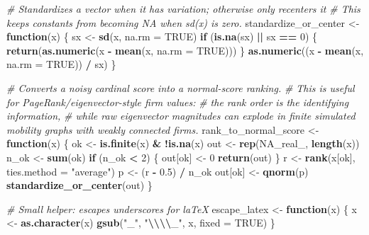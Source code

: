 \documentclass[
]{article}
\newenvironment{Shaded}{\begin{snugshade}}{\end{snugshade}}
\newcommand{\AttributeTok}[1]{\textcolor[rgb]{0.13,0.29,0.53}{#1}}
\newcommand{\CommentTok}[1]{\textcolor[rgb]{0.56,0.35,0.01}{\textit{#1}}}
\newcommand{\ConstantTok}[1]{\textcolor[rgb]{0.56,0.35,0.01}{#1}}
\newcommand{\ControlFlowTok}[1]{\textcolor[rgb]{0.13,0.29,0.53}{\textbf{#1}}}
\newcommand{\DecValTok}[1]{\textcolor[rgb]{0.00,0.00,0.81}{#1}}
\newcommand{\FloatTok}[1]{\textcolor[rgb]{0.00,0.00,0.81}{#1}}
\newcommand{\FunctionTok}[1]{\textcolor[rgb]{0.13,0.29,0.53}{\textbf{#1}}}
\newcommand{\NormalTok}[1]{#1}
\newcommand{\OtherTok}[1]{\textcolor[rgb]{0.56,0.35,0.01}{#1}}
\newcommand{\SpecialCharTok}[1]{\textcolor[rgb]{0.81,0.36,0.00}{\textbf{#1}}}
\newcommand{\StringTok}[1]{\textcolor[rgb]{0.31,0.60,0.02}{#1}}
\begin{document}
\begin{Shaded}
\begin{Highlighting}[]
\CommentTok{\# Standardizes a vector when it has variation; otherwise only recenters it}
\CommentTok{\# This keeps constants from becoming NA when sd(x) is zero.}
\NormalTok{standardize\_or\_center }\OtherTok{\textless{}{-}} \ControlFlowTok{function}\NormalTok{(x) \{}
\NormalTok{    sx }\OtherTok{\textless{}{-}} \FunctionTok{sd}\NormalTok{(x, }\AttributeTok{na.rm =} \ConstantTok{TRUE}\NormalTok{)}
    \ControlFlowTok{if}\NormalTok{ (}\FunctionTok{is.na}\NormalTok{(sx) }\SpecialCharTok{||}\NormalTok{ sx }\SpecialCharTok{==} \DecValTok{0}\NormalTok{) \{}
        \FunctionTok{return}\NormalTok{(}\FunctionTok{as.numeric}\NormalTok{(x }\SpecialCharTok{{-}} \FunctionTok{mean}\NormalTok{(x, }\AttributeTok{na.rm =} \ConstantTok{TRUE}\NormalTok{)))}
\NormalTok{    \}}
    \FunctionTok{as.numeric}\NormalTok{((x }\SpecialCharTok{{-}} \FunctionTok{mean}\NormalTok{(x, }\AttributeTok{na.rm =} \ConstantTok{TRUE}\NormalTok{)) }\SpecialCharTok{/}\NormalTok{ sx)}
\NormalTok{\}}

\CommentTok{\# Converts a noisy cardinal score into a normal{-}score ranking.}
\CommentTok{\# This is useful for PageRank/eigenvector{-}style firm values:}
\CommentTok{\# the rank order is the identifying information,}
\CommentTok{\# while raw eigenvector magnitudes can explode in finite simulated mobility graphs with weakly connected firms.}
\NormalTok{rank\_to\_normal\_score }\OtherTok{\textless{}{-}} \ControlFlowTok{function}\NormalTok{(x) \{}
\NormalTok{    ok }\OtherTok{\textless{}{-}} \FunctionTok{is.finite}\NormalTok{(x) }\SpecialCharTok{\&} \SpecialCharTok{!}\FunctionTok{is.na}\NormalTok{(x)}
\NormalTok{    out }\OtherTok{\textless{}{-}} \FunctionTok{rep}\NormalTok{(}\ConstantTok{NA\_real\_}\NormalTok{, }\FunctionTok{length}\NormalTok{(x))}
\NormalTok{    n\_ok }\OtherTok{\textless{}{-}} \FunctionTok{sum}\NormalTok{(ok)}
    \ControlFlowTok{if}\NormalTok{ (n\_ok }\SpecialCharTok{\textless{}} \DecValTok{2}\NormalTok{) \{}
\NormalTok{        out[ok] }\OtherTok{\textless{}{-}} \DecValTok{0}
        \FunctionTok{return}\NormalTok{(out)}
\NormalTok{    \}}
\NormalTok{    r }\OtherTok{\textless{}{-}} \FunctionTok{rank}\NormalTok{(x[ok], }\AttributeTok{ties.method =} \StringTok{"average"}\NormalTok{)}
\NormalTok{    p }\OtherTok{\textless{}{-}}\NormalTok{ (r }\SpecialCharTok{{-}} \FloatTok{0.5}\NormalTok{) }\SpecialCharTok{/}\NormalTok{ n\_ok}
\NormalTok{    out[ok] }\OtherTok{\textless{}{-}} \FunctionTok{qnorm}\NormalTok{(p)}
    \FunctionTok{standardize\_or\_center}\NormalTok{(out)}
\NormalTok{\}}

\CommentTok{\# Small helper: escapes underscores for laTeX}
\NormalTok{escape\_latex }\OtherTok{\textless{}{-}} \ControlFlowTok{function}\NormalTok{(x) \{}
\NormalTok{    x }\OtherTok{\textless{}{-}} \FunctionTok{as.character}\NormalTok{(x)}
    \FunctionTok{gsub}\NormalTok{(}\StringTok{"\_"}\NormalTok{, }\StringTok{"}\SpecialCharTok{\textbackslash{}\textbackslash{}\textbackslash{}\textbackslash{}}\StringTok{\_"}\NormalTok{, x, }\AttributeTok{fixed =} \ConstantTok{TRUE}\NormalTok{)}
\NormalTok{\}}


\end{Highlighting}
\end{Shaded}
\end{document}
